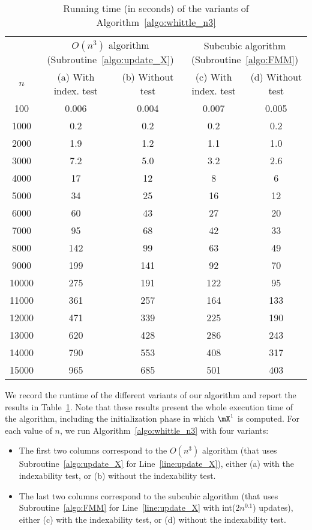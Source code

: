 \begin{table}[ht]
    \caption{Running time (in seconds) of the variants of Algorithm~\ref{algo:whittle_n3}}
    \label{table:running_time}
    \begin{tabular}{|c|c|c||c|c|}
        \hline
        &\multicolumn{2}{c||}{$O(n^3)$ algorithm (Subroutine~\ref{algo:update_X})} & \multicolumn{2}{c|}{Subcubic algorithm (Subroutine~\ref{algo:FMM})}\\
        $n$    &  (a) With index. test &  (b) Without test  & (c) With index. test &  (d) Without test  \\
        \hline
        100 & 0.006 & 0.004 & 0.007 & 0.005 \\
        1000 &   0.2 &   0.2 &   0.2 &   0.2 \\
        2000 &   1.9 &   1.2 &   1.1 &   1.0 \\
        3000 &   7.2 &   5.0 &   3.2 &   2.6 \\
        4000 &    17 &    12 &     8 &     6 \\
        5000 &    34 &    25 &    16 &    12 \\
        6000 &    60 &    43 &    27 &    20 \\
        7000 &    95 &    68 &    42 &    33 \\
        8000 &   142 &    99 &    63 &    49 \\
        9000 &   199 &   141 &    92 &    70 \\
        10000 &   275 &   191 &   122 &    95 \\
        11000 &   361 &   257 &   164 &   133 \\
        12000 &   471 &   339 &   225 &   190 \\
        13000 &   620 &   428 &   286 &   243 \\
        14000 &   790 &   553 &   408 &   317 \\
        15000 &   965 &   685 &   501 &   403 \\
        \hline
    \end{tabular}
\end{table}
We record the runtime of the different variants of our algorithm and report the results in Table~\ref{table:running_time}. Note that these results present the whole execution time of the algorithm, including the initialization phase in which $\mX^1$ is computed. For each value of $n$, we run Algorithm~\ref{algo:whittle_n3} with four variants: 
\begin{itemize}
    \item The first two columns correspond to the $O(n^3)$ algorithm (that uses Subroutine~\ref{algo:update_X} for Line~\ref{line:update_X}), either (a) with the indexability test, or (b) without the indexability test. 
    \item The last two columns correspond to the subcubic algorithm (that uses Subroutine~\ref{algo:FMM} for Line~\ref{line:update_X} with int($2n^{0.1}$) updates), either (c) with the indexability test, or (d) without the indexability test.
\end{itemize}
